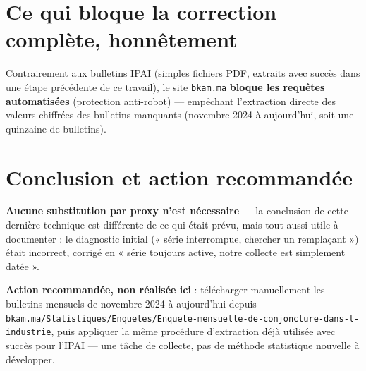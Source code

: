 \documentclass[11pt,a4paper]{article}
\begin{document}
\section{Ce qui bloque la correction complète, honnêtement}

\begin{fichebox}
Contrairement aux bulletins IPAI (simples fichiers PDF, extraits avec succès dans une étape précédente de ce travail), le site \texttt{bkam.ma} \textbf{bloque les requêtes automatisées} (protection anti-robot) --- empêchant l'extraction directe des valeurs chiffrées des bulletins manquants (novembre 2024 à aujourd'hui, soit une quinzaine de bulletins).
\end{fichebox}

\section{Conclusion et action recommandée}

\begin{fichebox}
\textbf{Aucune substitution par proxy n'est nécessaire} --- la conclusion de cette dernière technique est différente de ce qui était prévu, mais tout aussi utile à documenter : le diagnostic initial (« série interrompue, chercher un remplaçant ») était incorrect, corrigé en « série toujours active, notre collecte est simplement datée ».

\textbf{Action recommandée, non réalisée ici} : télécharger manuellement les bulletins mensuels de novembre 2024 à aujourd'hui depuis \texttt{bkam.ma/Statistiques/Enquetes/Enquete-mensuelle-de-conjoncture-dans-l-industrie}, puis appliquer la même procédure d'extraction déjà utilisée avec succès pour l'IPAI --- une tâche de collecte, pas de méthode statistique nouvelle à développer.
\end{fichebox}
\end{document}
